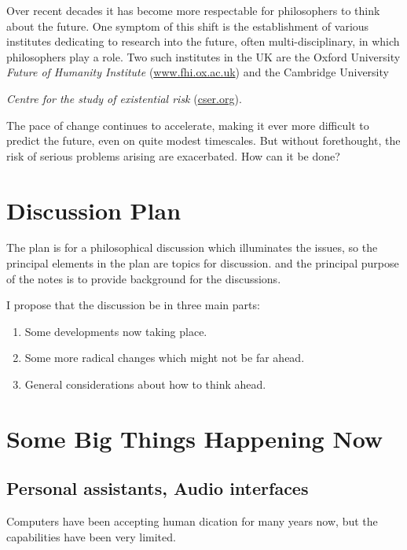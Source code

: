\documentclass[12pt,titlepage]{article}
\begin{document}
Over recent decades it has become more respectable for philosophers to think about the future.
One symptom of this shift is the establishment of various institutes dedicating to research
into the future, often multi-disciplinary, in which philosophers play a role.
Two such institutes in the UK are the Oxford University \emph{Future of Humanity Institute} (\href{http://www.fhi.ox.ac.uk}{www.fhi.ox.ac.uk}) and the Cambridge University {\emph{Centre for the study of existential risk} (\href{http://cser.org}{cser.org}).

The pace of change continues to accelerate, making it ever more difficult to predict the future, even on quite modest timescales.
But without forethought, the risk of serious problems arising are exacerbated.
How can it be done?

\section{Discussion Plan}

The plan is for a philosophical discussion which illuminates the issues, so the principal elements in the plan are topics for discussion. and the principal purpose of the notes is to provide background for the discussions.

I propose that the discussion be in three main parts:

\begin{enumerate}

\item Some developments now taking place.

\item Some more radical changes which might not be far ahead.

\item General considerations about how to think ahead.

\end{enumerate}

\section{Some Big Things Happening Now}

\subsection{Personal assistants, Audio interfaces}

Computers have been accepting human dication for
many years now, but the capabilities have been very
limited.

}
\end{document}
